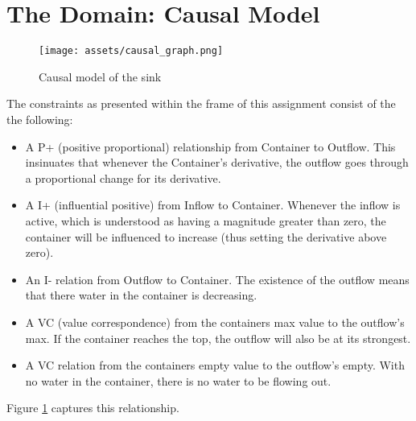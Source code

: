 \section{The Domain: Causal Model}
\label{sec: domain}

\begin{figure}
    \texttt{[image: assets/causal\_graph.png]}
    \caption{Causal model of the sink}
    \label{fig:causal_model}
\end{figure}

The constraints as presented within the frame of this assignment consist of the
the following:
\begin{itemize}
    \item A P+ (positive proportional) relationship from Container to Outflow.
    This insinuates that whenever the Container's derivative, the outflow goes
    through a proportional change for its derivative.
    \item A I+ (influential positive) from Inflow to Container. Whenever the
    inflow is active, which is understood as having a magnitude greater than
    zero, the container will be influenced to increase (thus setting the
    derivative above zero).
    \item An I- relation from Outflow to Container. The existence of the outflow
    means that there water in the container is decreasing.
    \item A VC (value correspondence) from the containers max value to the outflow's
    max. If the container reaches the top, the outflow will also be at its strongest.
    \item A VC relation from the containers empty value to the outflow's empty.
    With no water in the container, there is no water to be flowing out.
\end{itemize}

Figure \ref{fig:causal_model} captures this relationship.